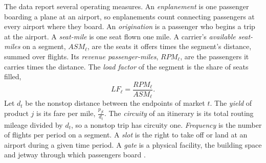 The data report several operating measures. An \emph{enplanement} is one passenger boarding a plane at an
airport, so enplanements count connecting passengers at every airport where they board. An
\emph{origination} is a passenger who begins a trip at the airport. A \emph{seat-mile} is one seat flown one
mile. A carrier's \emph{available seat-miles} on a segment, $\mathit{ASM}_\ell$, are the seats it offers times
the segment's distance, summed over flights. Its \emph{revenue passenger-miles}, $\mathit{RPM}_\ell$, are the
passengers it carries times the distance. The \emph{load factor} of the segment is the share of seats filled,
\begin{equation}\label{eq:09-loadfactor}
  \mathit{LF}_\ell = \frac{\mathit{RPM}_\ell}{\mathit{ASM}_\ell}.
\end{equation}
Let $d_t$ be the nonstop distance between the endpoints of market $t$. The \emph{yield} of product $j$ is its
fare per mile, $\frac{p_{jt}}{d_t}$. The \emph{circuity} of an itinerary is its total routing mileage divided
by $d_t$, so a nonstop trip has circuity one. \emph{Frequency} is the number of flights per period on a
segment. A \emph{slot} is the right to take off or land at an airport during a given time period. A
\emph{gate} is a physical facility, the building space and jetway through which passengers board
\citep[p.~347]{Borenstein1989}.

